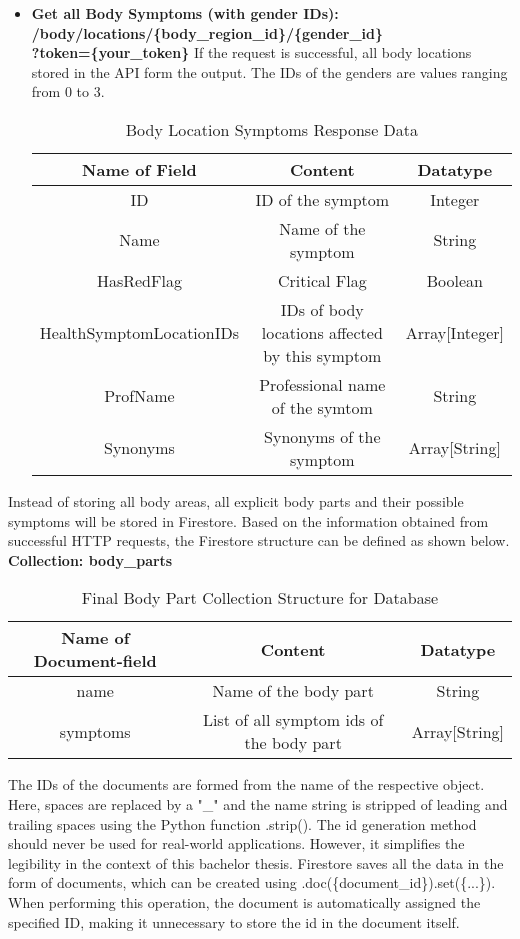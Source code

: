 \begin{itemize}
	\item \textbf{Get all Body Symptoms (with gender IDs): /body/locations/\{body\_region\_id\}/\{gender\_id\}\\?token=\{your\_token\}}
	\newline
	If the request is successful, all body locations stored in the API form the output. The IDs of the genders are values ranging from 0 to 3. 
		\scriptsize
		\begin{table}[H]
			\centering
		\begin{tabular}{ | c| c| c | } 
			\hline
			Name of Field& Content & Datatype \\ 
			\hline
			ID & ID of the symptom & Integer \\ 
			\hline
			Name & Name of the symptom & String \\ 
			\hline
			HasRedFlag & Critical Flag & Boolean \\ 
			\hline
			HealthSymptomLocationIDs & IDs of  body locations affected by this symptom & Array[Integer] \\ 
			\hline
			ProfName & Professional name of the symtom & String \\
			\hline 			
			Synonyms & Synonyms of the symptom & Array[String] \\
			\hline
		\end{tabular}
			 \caption{Body Location Symptoms Response Data}
		\end{table}
		\normalsize
\end{itemize}
Instead of storing all body areas, all explicit body parts and their possible symptoms will be stored in Firestore. Based on the information obtained from successful HTTP requests, the Firestore structure can be defined as shown below.
\newline
\textbf{Collection: body\_parts}
\begin{table}[H]
	\centering
	\begin{tabular}{ | c| c| c | } 
		\hline
		Name of Document-field& Content & Datatype \\ 
		\hline
		name & Name of the body part & String \\ 
		\hline
		symptoms & List of all symptom ids of the body part  & Array[String] \\ 
		\hline
	\end{tabular}
			 \caption{Final Body Part Collection Structure for Database}
\end{table}
\noindent
The IDs of the documents are formed from the name of the respective object. Here, spaces are replaced by a "\_" and the name string is stripped of leading and trailing spaces using the Python function .strip(). The id generation method should never be used for real-world applications. However, it simplifies the legibility in the context of this bachelor thesis. Firestore saves all the data in the form of documents, which can be created using .doc(\{document\_id\}).set(\{...\}). When performing this operation, the document is automatically assigned the specified ID, making it unnecessary to store the id in the document itself.

